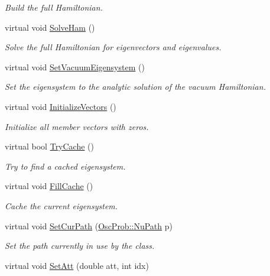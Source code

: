 \begin{DoxyCompactItemize}
\begin{DoxyCompactList}\small\item\em Build the full Hamiltonian. \end{DoxyCompactList}\item 
virtual void \hyperlink{classOscProb_1_1PMNS__Fast_a8a0828401591e88c60e0051fbfe02d5e}{Solve\+Ham} ()
\begin{DoxyCompactList}\small\item\em Solve the full Hamiltonian for eigenvectors and eigenvalues. \end{DoxyCompactList}\item 
virtual void \hyperlink{classOscProb_1_1PMNS__Fast_a76dd5a761df8689c502b28ad0391f9e2}{Set\+Vacuum\+Eigensystem} ()
\begin{DoxyCompactList}\small\item\em Set the eigensystem to the analytic solution of the vacuum Hamiltonian. \end{DoxyCompactList}\item 
virtual void \hyperlink{classOscProb_1_1PMNS__Base_adf23b569112f9f9e0e592f01d79a5f3d}{Initialize\+Vectors} ()
\begin{DoxyCompactList}\small\item\em Initialize all member vectors with zeros. \end{DoxyCompactList}\item 
virtual bool \hyperlink{classOscProb_1_1PMNS__Base_abe533da5f64bec1f4724ab7b58606b77}{Try\+Cache} ()
\begin{DoxyCompactList}\small\item\em Try to find a cached eigensystem. \end{DoxyCompactList}\item 
virtual void \hyperlink{classOscProb_1_1PMNS__Base_a785c37fcea974628623c8881bb0fbbf9}{Fill\+Cache} ()
\begin{DoxyCompactList}\small\item\em Cache the current eigensystem. \end{DoxyCompactList}\item 
virtual void \hyperlink{classOscProb_1_1PMNS__Base_a986e6ebef09a7e2eb7fee16a4c2c834d}{Set\+Cur\+Path} (\hyperlink{structOscProb_1_1NuPath}{Osc\+Prob\+::\+Nu\+Path} p)
\begin{DoxyCompactList}\small\item\em Set the path currently in use by the class. \end{DoxyCompactList}\item 
virtual void \hyperlink{classOscProb_1_1PMNS__Base_aba565962a440d14bee7a2a96d2eca2c5}{Set\+Att} (double att, int idx)

\end{DoxyCompactItemize}

